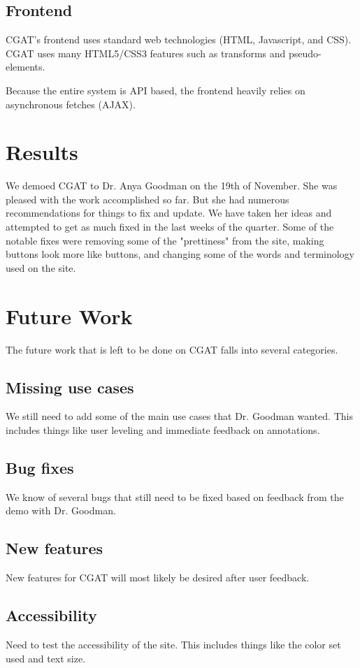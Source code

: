 \documentclass[10pt, conference, compsocconf]{IEEEtran}
\begin{document}
\subsection{Frontend}
CGAT's frontend uses standard web technologies (HTML, Javascript, and CSS).
CGAT uses many HTML5/CSS3 features such as transforms and pseudo-elements.

Because the entire system is API based, the frontend heavily relies on asynchronous fetches (AJAX).

\section{Results}\label{sec:results}
We demoed CGAT to Dr. Anya Goodman on the 19th of November. She was pleased with
the work accomplished so far. But she had numerous recommendations for things to fix and update.
We have taken her ideas and attempted to get as much fixed in the last weeks of the quarter.
Some of the notable fixes were removing some of the "prettiness" from the site, making
buttons look more like buttons, and changing some of the words and terminology used on the site.

\section{Future Work}\label{sec:future}
The future work that is left to be done on CGAT falls into several categories. 

\subsection{Missing use cases}
We still need to add some of the main use cases that Dr. Goodman wanted. This includes things like
user leveling and immediate feedback on annotations. 

\subsection{Bug fixes}
We know of several bugs that still need to be fixed based on feedback from the demo with
Dr. Goodman.

\subsection{New features}
New features for CGAT will most likely be desired after user feedback.

\subsection{Accessibility}
Need to test the accessibility of the site. This includes things like the color set used
and text size.
\end{document}
